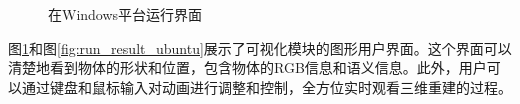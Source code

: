 \begin{figure}[htbp]
	\centering
	\caption{在Windows平台运行界面}
	\label{fig:run_result_windows}
\end{figure}

\par 图\ref{fig:run_result_windows}和图\ref{fig:run_result_ubuntu}展示了可视化模块的图形用户界面。这个界面可以清楚地看到物体的形状和位置，包含物体的RGB信息和语义信息。此外，用户可以通过键盘和鼠标输入对动画进行调整和控制，全方位实时观看三维重建的过程。

